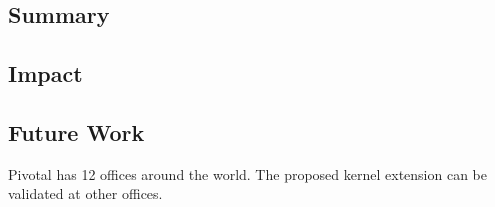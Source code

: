\documentclass[preprint,12pt,3p]{elsarticle}
\begin{document}
\subsection{Summary}
\subsection{Impact}
\subsection{Future Work}

Pivotal has 12 offices around the world. The proposed kernel extension can be validated at other offices.




% 
% 
% 
% 
% 
% 
% 
% 
% 
% 
% 
% 


\end{document}
